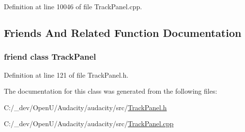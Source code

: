 Definition at line 10046 of file Track\+Panel.\+cpp.



\subsection{Friends And Related Function Documentation}
\subsubsection[{\texorpdfstring{Track\+Panel}{TrackPanel}}]{\setlength{\rightskip}{0pt plus 5cm}friend class {\bf Track\+Panel}\hspace{0.3cm}{\ttfamily [friend]}}\hypertarget{class_track_info_aaf0a26868e2a6f67a8c005e01e77d052}{}\label{class_track_info_aaf0a26868e2a6f67a8c005e01e77d052}


Definition at line 121 of file Track\+Panel.\+h.



The documentation for this class was generated from the following files\+:\begin{DoxyCompactItemize}
\item 
C\+:/\+\_\+dev/\+Open\+U/\+Audacity/audacity/src/\hyperlink{_track_panel_8h}{Track\+Panel.\+h}\item 
C\+:/\+\_\+dev/\+Open\+U/\+Audacity/audacity/src/\hyperlink{_track_panel_8cpp}{Track\+Panel.\+cpp}\end{DoxyCompactItemize}
